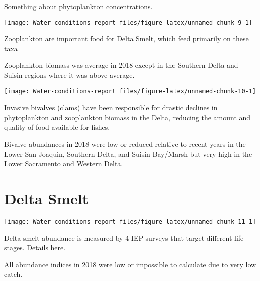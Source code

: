 \documentclass[]{article}
\begin{document}
Something about phytoplankton concentrations.

\begin{center}\texttt{[image: Water-conditions-report\_files/figure-latex/unnamed-chunk-9-1]} \end{center}

Zooplankton are important food for Delta Smelt, which feed primarily on
these taxa

Zooplankton biomass was average in 2018 except in the Southern Delta and
Suisin regions where it was above average.

\begin{center}\texttt{[image: Water-conditions-report\_files/figure-latex/unnamed-chunk-10-1]} \end{center}

Invasive bivalves (clams) have been responsible for drastic declines in
phytoplankton and zooplankton biomass in the Delta, reducing the amount
and quality of food available for fishes.

Bivalve abundances in 2018 were low or reduced relative to recent years
in the Lower San Joaquin, Southern Delta, and Suisin Bay/Marsh but very
high in the Lower Sacramento and Western Delta.

\hypertarget{delta-smelt}{%
\section{Delta Smelt}\label{delta-smelt}}

\begin{center}\texttt{[image: Water-conditions-report\_files/figure-latex/unnamed-chunk-11-1]} \end{center}

Delta smelt abundance is measured by 4 IEP surveys that target different
life stages. Details here.

All abundance indices in 2018 were low or impossible to calculate due to
very low catch.
\end{document}
